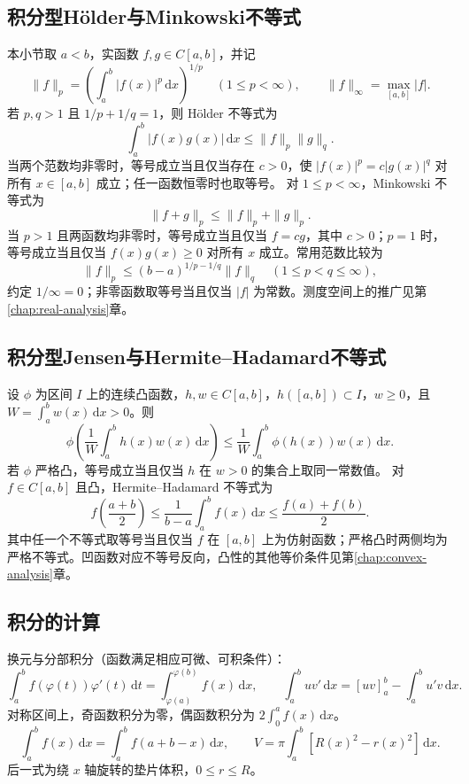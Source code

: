 \documentclass[../main.tex]{subfiles}
\begin{document}
\subsection{积分型H\"older与Minkowski不等式}
本小节取 $a<b$，实函数 $f,g\in C[a,b]$，并记
\[
\|f\|_p=\left(\int_a^b|f(x)|^p\,\mathrm dx\right)^{1/p}
\quad(1\le p<\infty),\qquad
\|f\|_\infty=\max_{[a,b]}|f|.
\]
若 $p,q>1$ 且 $1/p+1/q=1$，则 H\"older 不等式为
\[
\int_a^b|f(x)g(x)|\,\mathrm dx\le\|f\|_p\|g\|_q.
\]
当两个范数均非零时，等号成立当且仅当存在 $c>0$，使 $|f(x)|^p=c|g(x)|^q$ 对所有 $x\in[a,b]$ 成立；任一函数恒零时也取等号。
对 $1\le p<\infty$，Minkowski 不等式为
\[
\|f+g\|_p\le\|f\|_p+\|g\|_p.
\]
当 $p>1$ 且两函数均非零时，等号成立当且仅当 $f=cg$，其中 $c>0$；$p=1$ 时，等号成立当且仅当 $f(x)g(x)\ge0$ 对所有 $x$ 成立。常用范数比较为
\[
\|f\|_p\le(b-a)^{1/p-1/q}\|f\|_q
\quad(1\le p<q\le\infty),
\]
约定 $1/\infty=0$；非零函数取等号当且仅当 $|f|$ 为常数。测度空间上的推广见第\ref{chap:real-analysis}章。
\par\pagebreak[0]\begin{samepage}
\subsection{积分型Jensen与Hermite--Hadamard不等式}
设 $\phi$ 为区间 $I$ 上的连续凸函数，$h,w\in C[a,b]$，$h([a,b])\subset I$，$w\ge0$，且 $W=\int_a^bw(x)\,\mathrm dx>0$。则
\[
\phi\!\left(\frac1W\int_a^bh(x)w(x)\,\mathrm dx\right)
\le\frac1W\int_a^b\phi(h(x))w(x)\,\mathrm dx.
\]
若 $\phi$ 严格凸，等号成立当且仅当 $h$ 在 $w>0$ 的集合上取同一常数值。
对 $f\in C[a,b]$ 且凸，Hermite--Hadamard 不等式为
\[
f\!\left(\frac{a+b}2\right)
\le\frac1{b-a}\int_a^bf(x)\,\mathrm dx
\le\frac{f(a)+f(b)}2.
\]
其中任一个不等式取等号当且仅当 $f$ 在 $[a,b]$ 上为仿射函数；严格凸时两侧均为严格不等式。凹函数对应不等号反向，凸性的其他等价条件见第\ref{chap:convex-analysis}章。
\par\end{samepage}\pagebreak[0]
\subsection{积分的计算}
换元与分部积分（函数满足相应可微、可积条件）：
\[
\int_a^b f(\varphi(t))\varphi'(t)\,\mathrm dt
=\int_{\varphi(a)}^{\varphi(b)}f(x)\,\mathrm dx,\qquad
\int_a^b u v'\,\mathrm dx=[uv]_a^b-\int_a^b u'v\,\mathrm dx.
\]
对称区间上，奇函数积分为零，偶函数积分为 $2\int_0^a f(x)\,\mathrm dx$。
\[
\int_a^b f(x)\,\mathrm dx=\int_a^b f(a+b-x)\,\mathrm dx,\qquad
V=\pi\int_a^b[R(x)^2-r(x)^2]\,\mathrm dx.
\]
后一式为绕 $x$ 轴旋转的垫片体积，$0\le r\le R$。
\end{document}
